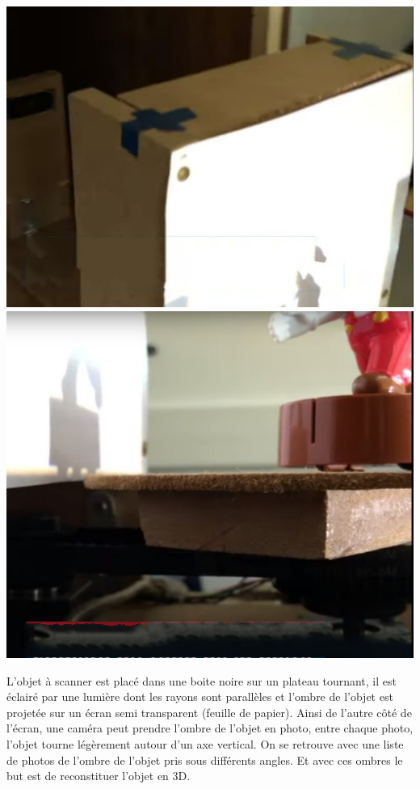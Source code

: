 \documentclass{article}
\begin{document}
\includegraphics[scale=0.25]{3}\includegraphics[scale=0.25]{4}

L'objet à scanner est placé dans une boite noire sur un plateau tournant,
il est éclairé par une lumière dont les rayons sont parallèles et
l'ombre de l'objet est projetée sur un écran semi transparent (feuille
de papier). Ainsi de l'autre côté de l'écran, une caméra peut prendre
l'ombre de l'objet en photo, entre chaque photo, l'objet tourne légèrement
autour d'un axe vertical. On se retrouve avec une liste de photos
de l'ombre de l'objet pris sous différents angles. Et avec ces ombres
le but est de reconstituer l'objet en 3D.
\end{document}
